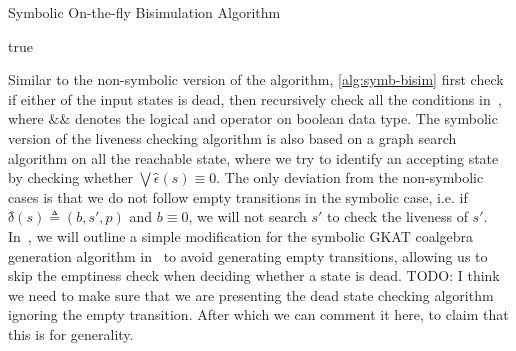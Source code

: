 \documentclass[conference]{IEEEtran}
\begin{document}
\begin{algorithm*}
    \caption{Symbolic On-the-fly Bisimulation Algorithm}\label{alg:symb-bisim}
    \begin{algorithmic}
         {\Return true}
         {\Return {}} 
         {\Return {}} 
        \Else {}
        \EndIf
        \EndFunction
    \end{algorithmic}
\end{algorithm*}

Similar to the non-symbolic version of the algorithm, \cref{alg:symb-bisim} first check if either of the input states is dead, then  recursively check all the conditions in~, where \(\mathrel{\&\!\&}\) denotes the logical and operator on boolean data type.
The symbolic version of the liveness checking algorithm is also based on a graph search algorithm on all the reachable state, where we try to identify an accepting state by checking whether \(⋁ ϵ̂(s) ≡ 0\).
The only deviation from the non-symbolic cases is that we do not follow empty transitions in the symbolic case, i.e. if \(δ̂(s) ≜ (b, s', p)\) and \(b ≡ 0\), we will not search \(s'\) to check the liveness of \(s'\).
In~, we will outline a simple modification for the symbolic GKAT coalgebra generation algorithm in~ to avoid generating empty transitions, allowing us to skip the emptiness check when deciding whether a state is dead.
TODO: I think we need to make sure that we are presenting the dead state checking algorithm ignoring the empty transition.
After which we can comment it here, to claim that this is for generality.
\end{document}
